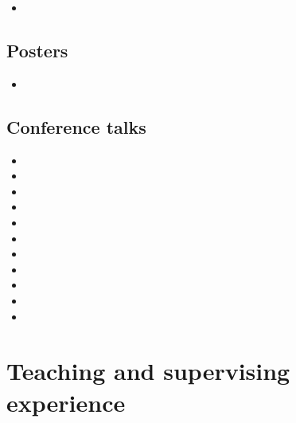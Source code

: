 \documentclass{scrartcl}
\begin{document}
\begin{itemize}
  \item {}
\end{itemize}

\subsection*{Posters}

\begin{itemize}
  \item {}
\end{itemize}

\subsection*{Conference talks}
\label{sec:Quelq-autr-expos}

\begin{itemize}
  \item {}
  \item {}
  \item {}
  \item {}
  \item {}
  \item {}
  \item {}
  \item {}
  \item {}
  \item {}
  \item {}
\end{itemize}


\section*{Teaching and supervising experience}
\label{sec:Teaching}
\end{document}
